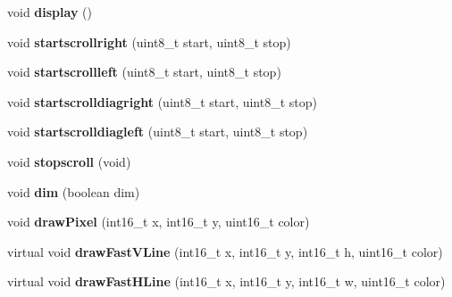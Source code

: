 \begin{DoxyCompactItemize}
\item 
\hypertarget{class_adafruit___s_s_d1306_aeaa87aea232bb42cbcc642e510f0d95a}{}void {\bfseries display} ()\label{class_adafruit___s_s_d1306_aeaa87aea232bb42cbcc642e510f0d95a}

\item 
\hypertarget{class_adafruit___s_s_d1306_a6a9f18f43c19296dc54dfb657eab4d66}{}void {\bfseries startscrollright} (uint8\+\_\+t start, uint8\+\_\+t stop)\label{class_adafruit___s_s_d1306_a6a9f18f43c19296dc54dfb657eab4d66}

\item 
\hypertarget{class_adafruit___s_s_d1306_a4c58c2a4ac905e199d6ced49a0098296}{}void {\bfseries startscrollleft} (uint8\+\_\+t start, uint8\+\_\+t stop)\label{class_adafruit___s_s_d1306_a4c58c2a4ac905e199d6ced49a0098296}

\item 
\hypertarget{class_adafruit___s_s_d1306_adbc9f95bb91eb0e76c4465d3c4d941e1}{}void {\bfseries startscrolldiagright} (uint8\+\_\+t start, uint8\+\_\+t stop)\label{class_adafruit___s_s_d1306_adbc9f95bb91eb0e76c4465d3c4d941e1}

\item 
\hypertarget{class_adafruit___s_s_d1306_a8d5b19419f508e5133053fa39da10f98}{}void {\bfseries startscrolldiagleft} (uint8\+\_\+t start, uint8\+\_\+t stop)\label{class_adafruit___s_s_d1306_a8d5b19419f508e5133053fa39da10f98}

\item 
\hypertarget{class_adafruit___s_s_d1306_ab4559d6aae71a4de8969f9160a6eda40}{}void {\bfseries stopscroll} (void)\label{class_adafruit___s_s_d1306_ab4559d6aae71a4de8969f9160a6eda40}

\item 
\hypertarget{class_adafruit___s_s_d1306_ae918422325b9fabc7396207263269d3a}{}void {\bfseries dim} (boolean dim)\label{class_adafruit___s_s_d1306_ae918422325b9fabc7396207263269d3a}

\item 
\hypertarget{class_adafruit___s_s_d1306_ae2851d927a047a770c569c7c9fde4807}{}void {\bfseries draw\+Pixel} (int16\+\_\+t x, int16\+\_\+t y, uint16\+\_\+t color)\label{class_adafruit___s_s_d1306_ae2851d927a047a770c569c7c9fde4807}

\item 
\hypertarget{class_adafruit___s_s_d1306_a2058c782206fd0c7a74a1d6d19a383b6}{}virtual void {\bfseries draw\+Fast\+V\+Line} (int16\+\_\+t x, int16\+\_\+t y, int16\+\_\+t h, uint16\+\_\+t color)\label{class_adafruit___s_s_d1306_a2058c782206fd0c7a74a1d6d19a383b6}

\item 
\hypertarget{class_adafruit___s_s_d1306_a8165eca9ccfee431af10b6f5fa06a406}{}virtual void {\bfseries draw\+Fast\+H\+Line} (int16\+\_\+t x, int16\+\_\+t y, int16\+\_\+t w, uint16\+\_\+t color)\label{class_adafruit___s_s_d1306_a8165eca9ccfee431af10b6f5fa06a406}

\end{DoxyCompactItemize}
